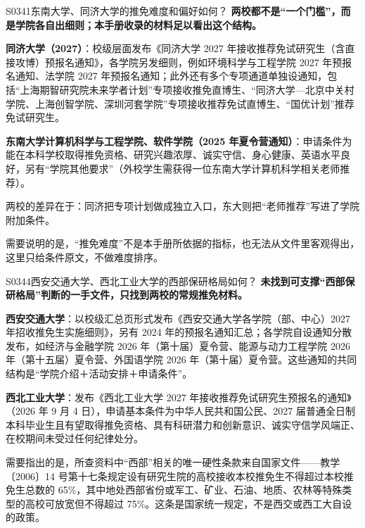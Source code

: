 \begin{qa}{S0341}{东南大学、同济大学的推免难度和偏好如何？}
\textbf{两校都不是“一个门槛”，而是学院各自出细则；本手册收录的材料足以看出这个结构。}

\textbf{同济大学（2027）}：校级层面发布《同济大学 2027 年接收推荐免试研究生（含直接攻博）预报名通知》，各学院另发细则，例如环境科学与工程学院 2027 年预报名通知、法学院 2027 年预报名通知；此外还有多个专项通道单独设通知，包括“上海期智研究院未来学者计划”专项接收推免直博生、“同济大学—北京中关村学院、上海创智学院、深圳河套学院”专项接收推荐免试直博生、“国优计划”推荐免试研究生。

\textbf{东南大学计算机科学与工程学院、软件学院（2025 年夏令营通知）}：申请条件为能在本科学校取得推免资格、研究兴趣浓厚、诚实守信、身心健康、英语水平良好，另有“学院其他要求”（外校学生需获得一位东南大学计算机科学相关老师推荐）。

两校的差异在于：同济把专项计划做成独立入口，东大则把“老师推荐”写进了学院附加条件。

需要说明的是，“推免难度”不是本手册所依据的指标，也无法从文件里客观得出，这里只给条件原文，不做难度排序。
\end{qa}

\begin{qa}{S0344}{西安交通大学、西北工业大学的西部保研格局如何？}
\textbf{未找到可支撑“西部保研格局”判断的一手文件，只找到两校的常规推免材料。}

\textbf{西安交通大学}：以校级汇总页形式发布《西安交通大学各学院（部、中心）2027 年招收推免生实施细则》，另有 2024 年的预报名通知汇总；各学院自设通知分散发布，如经济与金融学院 2026 年（第十届）夏令营、能源与动力工程学院 2026 年（第十五届）夏令营、外国语学院 2026 年（第十届）夏令营。这些通知的共同结构是“学院介绍＋活动安排＋申请条件”。

\textbf{西北工业大学}：发布《西北工业大学 2027 年接收推荐免试研究生预报名的通知》（2026 年 9 月 4 日），申请基本条件为中华人民共和国公民、2027 届普通全日制本科毕业生且有望取得推免资格、具有科研潜力和创新意识、诚实守信学风端正、在校期间未受过任何纪律处分。

需要指出的是，所查资料中“西部”相关的唯一硬性条款来自国家文件——教学〔2006〕14 号第十七条规定设有研究生院的高校接收本校推免生不得超过本校推免生总数的 65\%，其中地处西部省份或军工、矿业、石油、地质、农林等特殊类型的高校可放宽但不得超过 75\%。这条是国家统一规定，不是西交或西工大自设的政策。
\end{qa}

